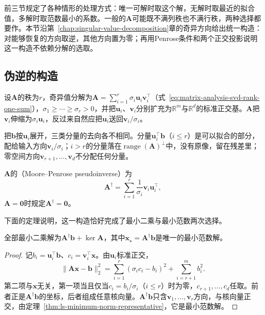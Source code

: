 前三节规定了各种情形的处理方式：唯一可解时取这个解，无解时取最近的拟合值，多解时取范数最小的系数。一般的$\bm A$可能既不满列秩也不满行秩，两种选择都要作。本节沿第~\ref{chap:singular-value-decomposition}章的奇异方向给出统一构造：对能够恢复的方向取逆，其他方向置为零；再用Penrose条件和两个正交投影说明这一构造不依赖分解的选取。

\subsection{伪逆的构造}
\label{sec:ls-pseudoinverse-construction}

设$\bm A$的秩为$r$，奇异值分解为$\bm A=\sum_{i=1}^r\sigma_i\bm u_i\bm v_i^\top$（式~\eqref{eq:matrix-analysis-svd-rank-one-sum}），$\sigma_1\geq\cdots\geq\sigma_r>0$，并把$\bm u_i$、$\bm v_i$分别扩充为$\mathbb R^m$与$\mathbb R^d$的标准正交基。$\bm A$把$\bm v_i$伸缩为$\sigma_i\bm u_i$，反过来自然应把$\bm u_i$送回$\bm v_i/\sigma_i$。

把$\bm b$按$\bm u_i$展开，三类分量的去向各不相同。分量$\bm u_i^\top\bm b$（$i\leq r$）是可以拟合的部分，配给输入方向$\bm v_i/\sigma_i$；$i>r$的分量落在$\operatorname{range}(\bm A)^\perp$中，没有原像，留在残差里；零空间方向$\bm v_{r+1},\ldots,\bm v_d$不分配任何分量。

\begin{definition}
\label{def:matrix-analysis-pseudoinverse}
$\bm A$的（Moore--Penrose pseudoinverse）为
\begin{equation}
 \bm A^\dagger=\sum_{i=1}^r\frac{1}{\sigma_i}\bm v_i\bm u_i^\top ,
 \label{eq:matrix-analysis-pseudoinverse}
\end{equation}
$\bm A=\bm0$时规定$\bm A^\dagger=\bm0$。
\end{definition}

下面的定理说明，这一构造恰好完成了最小二乘与最小范数两次选择。

\begin{theorem}[伪逆给出最小范数最小二乘解]
\label{thm:matrix-analysis-pseudoinverse-minimum-norm}
全部最小二乘解为$\bm A^\dagger\bm b+\ker\bm A$，其中$\bm x_\star=\bm A^\dagger\bm b$是唯一的最小范数解。
\end{theorem}
\begin{proof}
记$b_i=\bm u_i^\top\bm b$、$c_i=\bm v_i^\top\bm x$。由$\bm u_i$标准正交，
\[
 \lVert\bm A\bm x-\bm b\rVert_2^2
 =\sum_{i=1}^r(\sigma_ic_i-b_i)^2+\sum_{i=r+1}^m b_i^2 .
\]
第二项与$\bm x$无关，第一项当且仅当$c_i=b_i/\sigma_i$（$i\leq r$）时为零，$c_{r+1},\ldots,c_d$任取。前者正是$\bm A^\dagger\bm b$的坐标，后者组成任意核向量。$\bm A^\dagger\bm b$只含$\bm v_1,\ldots,\bm v_r$方向，与核向量正交，由定理~\ref{thm:ls-minimum-norm-representative}，它是最小范数解。
\end{proof}

